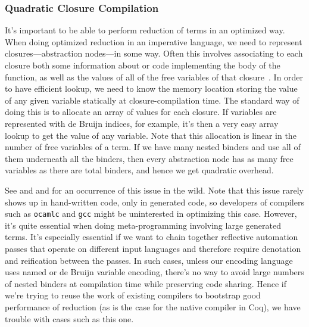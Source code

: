 \subsubsection{Quadratic Closure Compilation} \label{sec:perf:closure-compilation} \label{sec:perf:quadratic-vm-native}
It's important to be able to perform reduction of terms in an optimized way.
When doing optimized reduction in an imperative language, we need to represent closures---abstraction nodes---in some way.
Often this involves associating to each closure both some information about or code implementing the body of the function, as well as the values of all of the free variables of that closure~\cite{Efficient2000Shao}.
In order to have efficient lookup, we need to know the memory location storing the value of any given variable statically at closure-compilation time.
The standard way of doing this  is to allocate an array of values for each closure.
If variables are represented with de Bruijn indices, for example, it's then a very easy array lookup to get the value of any variable.
Note that this allocation is linear in the number of free variables of a term.
If we have many nested binders and use all of them underneath all the binders, then every abstraction node has as many free variables as there are total binders, and hence we get quadratic overhead.

See  and  and  for an occurrence of this issue in the wild.
Note that this issue rarely shows up in hand-written code, only in generated code, so developers of compilers such as \texttt{ocamlc} and \texttt{gcc} might be uninterested in optimizing this case.
However, it's quite essential when doing meta-programming involving large generated terms.
It's especially essential if we want to chain together reflective automation passes that operate on different input languages and therefore require denotation and reification between the passes.
In such cases, unless our encoding language uses named or de Bruijn variable encoding, there's no way to avoid large numbers of nested binders at compilation time while preserving code sharing.
Hence if we're trying to reuse the work of existing compilers to bootstrap good performance of reduction (as is the case for the native compiler in Coq), we have trouble with cases such as this one.

